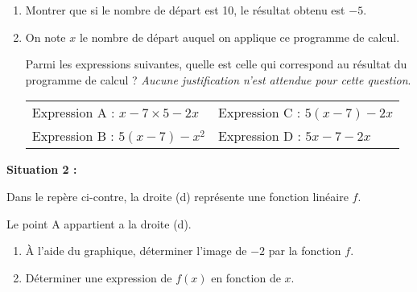 \begin{enumerate}
	\item Montrer que si le nombre de départ est 10, le résultat obtenu est $-5$.

	\item On note $x$ le nombre de départ auquel on applique ce programme de calcul.

	Parmi les expressions suivantes, quelle est celle qui correspond au résultat du programme de calcul ? \emph{Aucune justification n’est attendue pour cette question}.

\begin{tabularx}{\linewidth}{*{2}{X}}
Expression A : $x - 7 \times  5 - 2x$& Expression C : $5(x - 7) - 2x$\\
Expression B : $5(x - 7) - x^2$& Expression D : $5x - 7 - 2x$\\
\end{tabularx}
\end{enumerate}

\medskip

\begin{minipage}[t]{0.48\linewidth}
	\textbf{Situation 2 :}

Dans le repère ci-contre, la droite (d) représente une fonction linéaire $f$.

Le point A appartient a la droite (d).

\begin{enumerate}
	\item À l’aide du graphique, déterminer l’image de $- 2$ par la fonction $f$.

	\item Déterminer une expression de $f(x)$ en fonction de $x$.
\end{enumerate}
\end{minipage}
\hfill
{}

